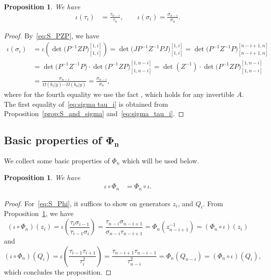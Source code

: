 \documentclass[10pt,a4paper]{amsart}
\numberwithin{equation}{section}
\newtheorem{Proposition}[Theorem]{Proposition}
\theoremstyle{definition}
\begin{document}
\begin{Proposition}
\label{prop:S_on_tau}
We have
\begin{align}
\label{eq:sigma tau_i}
\iota(\tau_i)&=\frac{\tau_{n-i}}{\tau_n},\qquad
\iota(\sigma_i)=\frac{\sigma_{n-i}}{\sigma_n}.
\end{align}
\end{Proposition}
\begin{proof}
By~\eqref{eq:S_PZP}, we have
\begin{align*}
\iota(\sigma_i)
&=\iota\left(\det\bigl(P^{-1}ZP\bigr)_{[1,i]}^{[1,i]}\right)=\det\bigl(JP^{-1}Z^{-1}PJ\bigr)_{[1,i]}^{[1,i]}=\det\bigl(P^{-1}Z^{-1}P\bigr)_{[n-i+1,n]}^{[n-i+1,n]}\\
&=
\det\bigl(P^{-1}Z^{-1}P\bigr)\cdot\det\bigl(P^{-1}ZP\bigr)_{[1,n-i]}^{[1,n-i]}=
\det(Z^{-1})\cdot\det\bigl(P^{-1}ZP\bigr)_{[1,n-i]}^{[1,n-i]}\\
&=\frac{\sigma_{n-i}}{\Omega(b_1|y)\cdots \Omega(b_n|y)}
=\frac{\sigma_{n-i}}{\sigma_n},
\end{align*}
where for the fourth equality
we use
the fact
,
which holds for any invertible $A$.
The first equality of~\eqref{eq:sigma tau_i} is obtained from Proposition~\ref{prop:S_and_sigma} and~\eqref{eq:sigma_tau_i}.
\end{proof}


\subsection[Basic properties of Phi\_n]{Basic properties of $\boldsymbol{\Phi_n}$}
We collect some basic properties of $\Phi_n$ which will be used below.

\begin{Proposition}\label{prop:S_commutes}
We have
\begin{align}
 \iota\circ \Phi_n&=\Phi_n \circ \iota.\label{eq:S_Phi}
\end{align}
\end{Proposition}
\begin{proof}
 For~\eqref{eq:S_Phi}, it suffices to show on generators $z_i$, and $Q_i$.
From Proposition~\ref{prop:S_on_tau}, we have
\[
(\iota\circ \Phi_n)(z_i)
=\iota\left(\frac{\tau_i\sigma_{i-1}}{\tau_{i-1}\sigma_i}\right)
=\frac{\tau_{n-i}\sigma_{n-i+1}}{\sigma_{n-i}\tau_{n-i+1}}=\Phi_n(z_{n-i+1}^{-1})
=(\Phi_n\circ \iota)(z_i)\]
and
\[
(\iota\circ\Phi_n)(Q_i)=\iota\left(\frac{\tau_{i-1}\tau_{i+1}}{\tau^2_{i}}\right)=
\frac{\tau_{n-i+1}\tau_{n-i-1}}{\tau^2_{n-i}}=\Phi_n(Q_{n-i})
=(\Phi_n\circ \iota)(Q_i),
\]
which concludes the proposition.
\end{proof}
\end{document}
